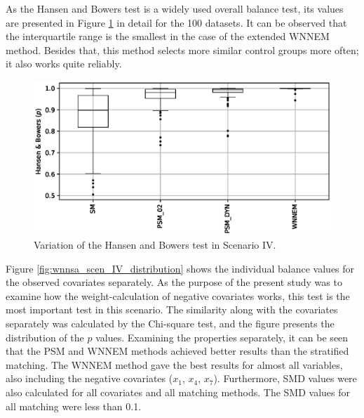 		As the Hansen and Bowers test is a widely used overall balance test, its values are presented in Figure \ref{fig:wnnsa_scen_IV_hbp} in detail for the 100 datasets. It can be observed that the interquartile range is the smallest in the case of the extended WNNEM method. Besides that, this method selects more similar control groups more often; it also works quite reliably.  
								
		\begin{figure}[h!]
			\centering
                \captionsetup{justification=centering}
			\includegraphics[width=\textwidth]{assets/figures/control_group_selection/wnnsa/scenIV/hbp.eps}
			\caption{Variation of the Hansen and Bowers test in Scenario IV. %
   }
			\label{fig:wnnsa_scen_IV_hbp}    
		\end{figure}
								
		Figure \ref{fig:wnnsa_scen_IV_distribution} shows the individual balance values for the observed covariates separately. As the purpose of the present study was to examine how the weight-calculation of negative covariates works, this test is the most important test in this scenario. The similarity along with the covariates separately was calculated by the Chi-square test, and the figure presents the distribution of the $p$ values. Examining the properties separately, it can be seen that the PSM and WNNEM methods achieved better results than the stratified matching. The WNNEM method gave the best results for almost all variables, also including the negative covariates ($x_1$, $x_4$, $x_7$). Furthermore, SMD values were also calculated for all covariates and all matching methods. The SMD values for all matching were less than 0.1.
								
